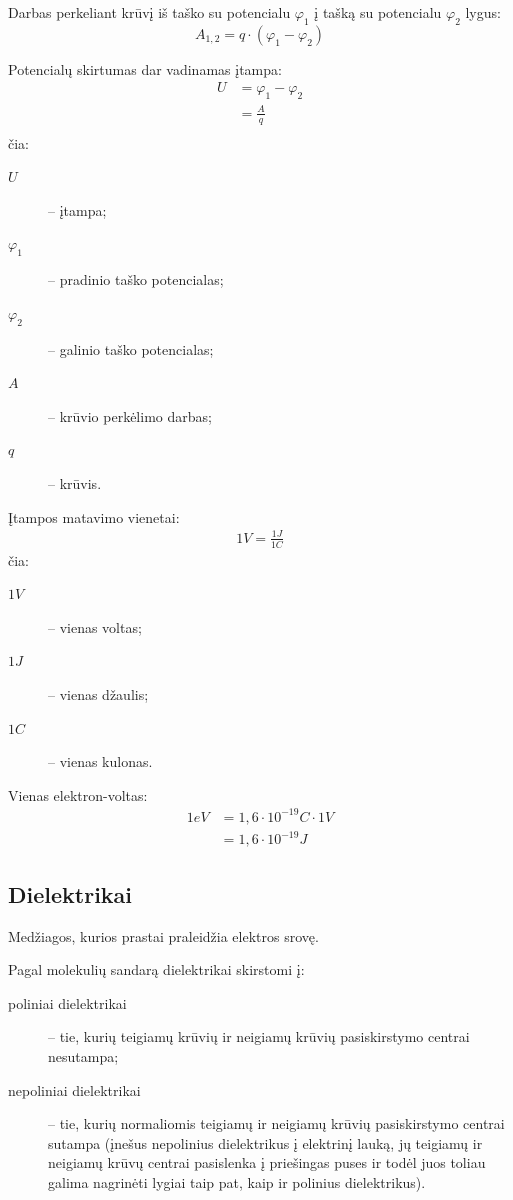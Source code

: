 Darbas perkeliant krūvį iš taško su potencialu $\varphi_{1}$ į tašką
su potencialu $\varphi_{2}$ lygus:
\begin{equation*}
  A_{1,2} = q \cdot (\varphi_{1} - \varphi_{2})
\end{equation*}

Potencialų skirtumas dar vadinamas įtampa:
\begin{align*}
  U
  &= \varphi_{1} - \varphi_{2} \\
  &= \frac{A}{q} \\
\end{align*}
čia:
\begin{description}
  \item[$U$] – įtampa;
  \item[$\varphi_{1}$] – pradinio taško potencialas;
  \item[$\varphi_{2}$] – galinio taško potencialas;
  \item[$A$] – krūvio perkėlimo darbas;
  \item[$q$] – krūvis.
\end{description}

Įtampos matavimo vienetai:
\begin{align*}
  1 V = \frac{1 J}{1 C}
\end{align*}
čia:
\begin{description}
  \item[$1 V$] – vienas voltas;
  \item[$1 J$] – vienas džaulis;
  \item[$1 C$] – vienas kulonas.
\end{description}

Vienas elektron-voltas:
\begin{align*}
  1 eV
  &= 1,6 \cdot 10^{-19} C \cdot 1 V\\
  &= 1,6 \cdot 10^{-19} J
\end{align*}

\subsection{Dielektrikai}

\begin{defn}[Dielektrikai]
  Medžiagos, kurios prastai praleidžia elektros srovę.
\end{defn}

Pagal molekulių sandarą dielektrikai skirstomi į:
\begin{description}
  \item[poliniai dielektrikai] – tie, kurių teigiamų krūvių ir neigiamų
    krūvių pasiskirstymo centrai nesutampa;
  \item[nepoliniai dielektrikai] – tie, kurių normaliomis teigiamų
    ir neigiamų krūvių pasiskirstymo centrai sutampa (įnešus nepolinius
    dielektrikus į elektrinį lauką, jų teigiamų ir neigiamų krūvų
    centrai pasislenka į priešingas puses ir todėl juos toliau
    galima nagrinėti lygiai taip pat, kaip ir polinius dielektrikus).
\end{description}

